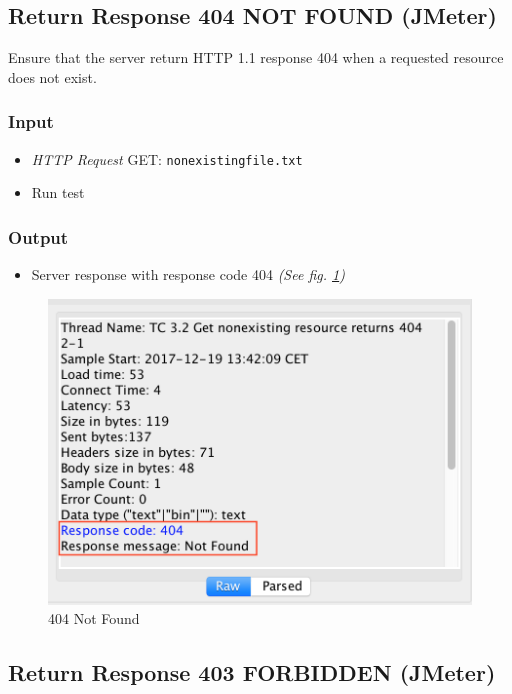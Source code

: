 \documentclass[a4paper, 12pt]{article}
\begin{document}
\subsection{Return Response 404 NOT FOUND (JMeter)}

Ensure that the server return HTTP 1.1 response 404 when a requested resource does not exist.

\subsubsection{Input}
\begin{itemize}
\item \textit{HTTP Request} GET: \texttt{nonexistingfile.txt}
\item Run test
\end{itemize}

\subsubsection{Output}
\begin{itemize}
\item Server response with response code 404 \textit{(See fig. \ref{TC3.2})}
\end{itemize}

\begin{figure}[H]
\includegraphics[scale=0.7]{output_clarification/404NOTFOUND.png} 
\caption{404 Not Found}
\label{TC3.2}
\end{figure}


\subsection{Return Response 403 FORBIDDEN (JMeter)}
\end{document}

